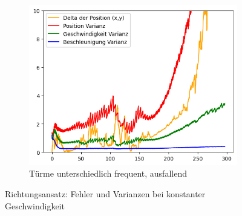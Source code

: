 \begin{figure}
\begin{subfigure}{.333\textwidth}
        \includegraphics[width=.9\linewidth]{Ergebnisse/plots_ungenauigkeiten/richtung/richtung_const_vel_flag_freq.png}
        \caption{Türme unterschiedlich frequent, ausfallend}
    \end{subfigure}
    \caption{Richtungsansatz: Fehler und Varianzen bei konstanter Geschwindigkeit}
    \label{abb:richtung-cv-fehler}
\end{figure}